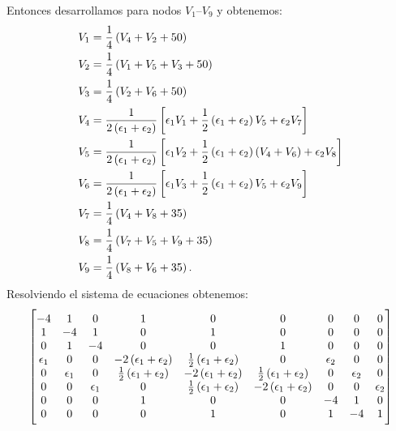 \documentclass[
  11pt,
  letterpaper,
   answers
  ]{exam}
\begin{document}
\begin{questions}
\begin{solution}
\begin{center}
\begin{tikzpicture}
      \end{tikzpicture}
      \label{fig:fdm_sol}
    \end{center}
  Entonces desarrollamos para nodos $V_1$--$V_9$ y obtenemos:
    \begin{align}
      V_1 &= \frac{1}{4}\del{V_4 + V_2 + \num{50}} \\
      V_2 &= \frac{1}{4}\del{V_1 + V_5 + V_3 + \num{50}} \\
      V_3 &= \frac{1}{4}\del{V_2 + V_6 + \num{50}} \\
      V_4 &= \frac{1}{2\del{\epsilon_1 + \epsilon_2}} \sbr{\epsilon_1V_1 + \frac{1}{2}\del{\epsilon_1 + \epsilon_2}V_5 + \epsilon_2V_7} \\
      V_5 &= \frac{1}{2\del{\epsilon_1 + \epsilon_2}} \sbr{\epsilon_1V_2 + \frac{1}{2}\del{\epsilon_1 + \epsilon_2}\del{V_4 + V_6} + \epsilon_2V_8} \\
      V_6 &= \frac{1}{2\del{\epsilon_1 + \epsilon_2}} \sbr{\epsilon_1V_3 + \frac{1}{2}\del{\epsilon_1 + \epsilon_2}V_5 + \epsilon_2V_9} \\
      V_7 &= \frac{1}{4}\del{V_4 + V_8 + \num{35}} \\
      V_8 &= \frac{1}{4}\del{V_7 + V_5 + V_9 + \num{35}} \\
      V_9 &= \frac{1}{4}\del{V_8 + V_6 + \num{35}}.
    \end{align}
    Resolviendo el sistema de ecuaciones obtenemos:
    \begin{align}
      \sbr{\begin{matrix}
         -4 & 1 & 0 & 1 & 0 & 0 & 0 & 0 & 0 \\
          1 & -4 & 1 & 0 & 1 & 0 & 0 & 0 & 0 \\
          0 & 1 & -4 & 0 & 0 & 1 & 0 & 0 & 0 \\
          \epsilon_1 & 0 & 0 & -2\del{\epsilon_1 + \epsilon_2} & \frac{1}{2}\del{\epsilon_1 + \epsilon_2} & 0 & \epsilon_2 & 0 & 0 \\
          0 & \epsilon_1 & 0 & \frac{1}{2}\del{\epsilon_1 + \epsilon_2} & -2\del{\epsilon_1 + \epsilon_2} & \frac{1}{2}\del{\epsilon_1 + \epsilon_2} & 0 & \epsilon_2 & 0 \\
          0 & 0 & \epsilon_1 & 0 & \frac{1}{2}\del{\epsilon_1 + \epsilon_2} & -2\del{\epsilon_1 + \epsilon_2} & 0 & 0 & \epsilon_2 \\
          0 & 0 & 0 & 1 & 0 & 0 & -4 & 1 & 0 \\
          0 & 0 & 0 & 0 & 1 & 0 & 1 & -4 & 1 \\

\end{matrix}}
\end{align}
\end{solution}
\end{questions}
\end{document}
